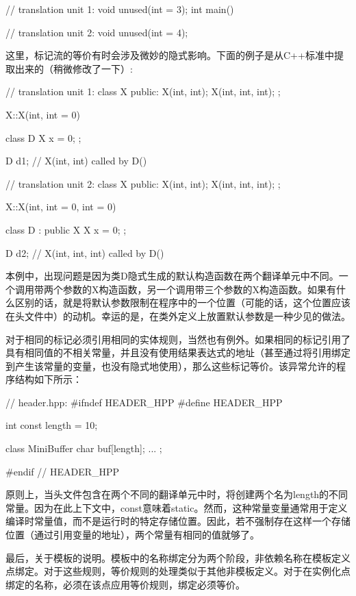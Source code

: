 \begin{cpp}
// translation unit 1:
void unused(int = 3);
int main() { }

// translation unit 2:
void unused(int = 4);
\end{cpp}

这里，标记流的等价有时会涉及微妙的隐式影响。下面的例子是从C++标准中提取出来的（稍微修改了一下）:

\begin{cpp}
// translation unit 1:
class X {
	public:
	X(int, int);
	X(int, int, int);
};

X::X(int, int = 0) { }

class D {
	X x = 0;
};

D d1; // X(int, int) called by D()

// translation unit 2:
class X {
	public:
	X(int, int);
	X(int, int, int);
};

X::X(int, int = 0, int = 0) { }

class D : public X {
	X x = 0;
};

D d2; // X(int, int, int) called by D()
\end{cpp}

本例中，出现问题是因为类D隐式生成的默认构造函数在两个翻译单元中不同。一个调用带两个参数的X构造函数，另一个调用带三个参数的X构造函数。如果有什么区别的话，就是将默认参数限制在程序中的一个位置（可能的话，这个位置应该在头文件中）的动机。幸运的是，在类外定义上放置默认参数是一种少见的做法。

对于相同的标记必须引用相同的实体规则，当然也有例外。如果相同的标记引用了具有相同值的不相关常量，并且没有使用结果表达式的地址（甚至通过将引用绑定到产生该常量的变量，也没有隐式地使用），那么这些标记等价。该异常允许的程序结构如下所示：

\begin{cpp}
// header.hpp:
#ifndef HEADER_HPP
#define HEADER_HPP

int const length = 10;

class MiniBuffer {
	char buf[length];
	...
};

#endif // HEADER_HPP
\end{cpp}

原则上，当头文件包含在两个不同的翻译单元中时，将创建两个名为length的不同常量。因为在此上下文中，const意味着static。然而，这种常量变量通常用于定义编译时常量值，而不是运行时的特定存储位置。因此，若不强制存在这样一个存储位置（通过引用变量的地址），两个常量有相同的值就够了。

最后，关于模板的说明。模板中的名称绑定分为两个阶段，非依赖名称在模板定义点绑定。对于这些规则，等价规则的处理类似于其他非模板定义。对于在实例化点绑定的名称，必须在该点应用等价规则，绑定必须等价。





